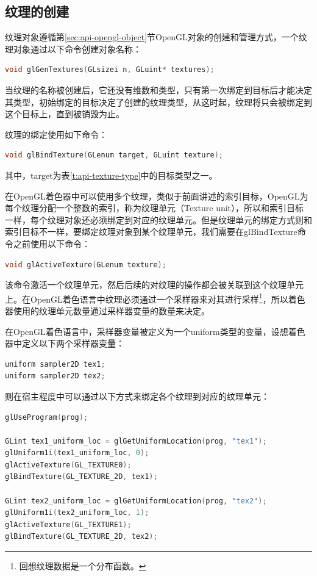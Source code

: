\subsection{纹理的创建}\label{sec:api-texture-create}
纹理对象遵循第\ref{sec:api-opengl-object}节OpenGL对象的创建和管理方式，一个纹理对象通过以下命令创建对象名称：

\begin{lstlisting}[language=C++]
void glGenTextures(GLsizei n, GLuint* textures);
\end{lstlisting}

当纹理的名称被创建后，它还没有维数和类型，只有第一次绑定到目标后才能决定其类型，初始绑定的目标决定了创建的纹理类型，从这时起，纹理将只会被绑定到这个目标上，直到被销毁为止。

纹理的绑定使用如下命令：

\begin{lstlisting}[language=C++]
void glBindTexture(GLenum target, GLuint texture);
\end{lstlisting}

其中，target为表\ref{t:api-texture-type}中的目标类型之一。

在OpenGL着色器中可以使用多个纹理，类似于前面讲述的索引目标，OpenGL为每个纹理分配一个整数的索引，称为纹理单元（Texture unit），所以和索引目标一样，每个纹理对象还必须绑定到对应的纹理单元。但是纹理单元的绑定方式则和索引目标不一样，要绑定纹理对象到某个纹理单元，我们需要在glBindTexture命令之前使用以下命令：

\begin{lstlisting}[language=C++]
void glActiveTexture(GLenum texture);
\end{lstlisting}

该命令激活一个纹理单元，然后后续的对纹理的操作都会被关联到这个纹理单元上。在OpenGL着色语言中纹理必须通过一个采样器来对其进行采样\footnote{回想纹理数据是一个分布函数。}，所以着色器使用的纹理单元数量通过采样器变量的数量来决定。

在OpenGL着色语言中，采样器变量被定义为一个uniform类型的变量，设想着色器中定义以下两个采样器变量：

\begin{lstlisting}[language=C++]
uniform sampler2D tex1;
uniform sampler2D tex2;
\end{lstlisting}

则在宿主程度中可以通过以下方式来绑定各个纹理到对应的纹理单元：

\begin{lstlisting}[language=C++]
glUseProgram(prog);

GLint tex1_uniform_loc = glGetUniformLocation(prog, "tex1");
glUniform1i(tex1_uniform_loc, 0);
glActiveTexture(GL_TEXTURE0);
glBindTexture(GL_TEXTURE_2D, tex1);
 	
GLint tex2_uniform_loc = glGetUniformLocation(prog, "tex2");
glUniform1i(tex2_uniform_loc, 1);
glActiveTexture(GL_TEXTURE1);
glBindTexture(GL_TEXTURE_2D, tex2);
\end{lstlisting}

